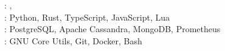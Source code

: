 \documentclass[letterpaper,11pt]{article}
\newif\ifen
\newif\ifes
\newcommand{\en}[1]{\ifen#1\fi}
\newcommand{\es}[1]{\ifes#1\fi}
\begin{document}
\section{\en{Technical Skills}}
\begin{itemize}[leftmargin=0.15in, label={}]
	\small{\item{
	      \textbf{\en{Languages}}{: \en{Spanish} , \en{English} } \\
	      \textbf{\en{Programming Languages}}{: Python, Rust, TypeScript, JavaScript, Lua} \\
	      \textbf{\en{Databases}}{: PostgreSQL, Apache Cassandra, MongoDB, Prometheus} \\
	      \textbf{\en{Developer Tools}}{: GNU Core Utils, Git, Docker, Bash} \\
	      }}
\end{itemize}
\end{document}
